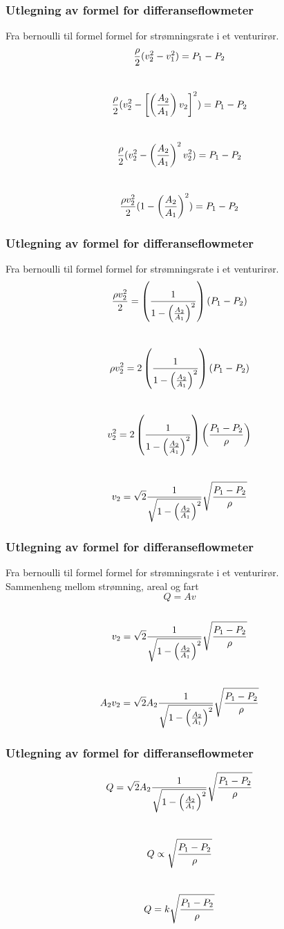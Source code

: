 \documentclass[aspectratio=169,xcolor=dvipsnames]{beamer}
\begin{document}
\begin{frame}
	\frametitle{Utlegning av formel for differanseflowmeter}
	Fra bernoulli til formel formel for strømningsrate i et venturirør. 
%
%
%
%
$${\rho \over 2} (v_2^2 - v_1^2) = P_1 - P_2$$
\\
$${\rho \over 2} (v_2^2 - \left[\left({A_2 \over A_1}\right) v_2\right]^2) = P_1 - P_2$$
\\
$${\rho \over 2} (v_2^2 - \left({A_2 \over A_1}\right)^2 v_2^2) = P_1 - P_2$$
\\
$${\rho v_2^2 \over 2} (1 - \left({A_2 \over A_1}\right)^2) = P_1 - P_2$$
\end{frame}

\begin{frame}
	\frametitle{Utlegning av formel for differanseflowmeter}
	Fra bernoulli til formel formel for strømningsrate i et venturirør. 
%
%
$${\rho v_2^2 \over 2} = \left({1 \over {1 - \left({A_2 \over A_1}\right)^2}}\right) (P_1 - P_2)$$
\\
$$\rho v_2^2 = 2 \left({1 \over {1 - \left({A_2 \over A_1}\right)^2}}\right) (P_1 - P_2)$$
\\
$$v_2^2 = 2 \left({1 \over {1 - \left({A_2 \over A_1}\right)^2}}\right) \left({{P_1 - P_2} \over \rho}\right)$$
\\
$$v_2 = \sqrt{2} {1 \over \sqrt{1 - \left({A_2 \over A_1}\right)^2}} \sqrt{{P_1 - P_2} \over \rho}$$
%
%
%
\end{frame}

\begin{frame}
	\frametitle{Utlegning av formel for differanseflowmeter}
	Fra bernoulli til formel formel for strømningsrate i et venturirør. 
\\
	Sammenheng mellom strømning, areal og fart
	\\
$$Q = Av$$
\\
$$v_2 = \sqrt{2} {1 \over \sqrt{1 - \left({A_2 \over A_1}\right)^2}} \sqrt{{P_1 - P_2} \over \rho}$$
\\
$$A_2 v_2 = \sqrt{2} A_2 {1 \over \sqrt{1 - \left({A_2 \over A_1}\right)^2}} \sqrt{{P_1 - P_2} \over \rho}$$
\end{frame}

\begin{frame}
	\frametitle{Utlegning av formel for differanseflowmeter}
$$Q = \sqrt{2} A_2 {1 \over \sqrt{1 - \left({A_2 \over A_1}\right)^2}} \sqrt{{P_1 - P_2} \over \rho}$$
\\
$$Q \propto \sqrt{{P_1 - P_2} \over \rho}$$
\\
$$Q = k \sqrt{{P_1 - P_2} \over \rho}$$
%
\end{frame}
\end{document}
